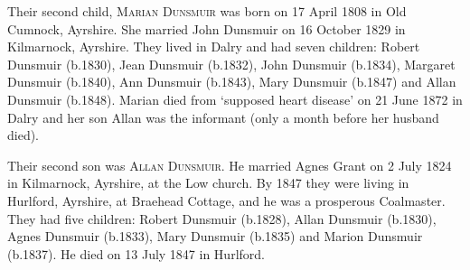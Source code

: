 Their second child, \textsc{Marian Dunsmuir} was born on 17 April 1808 in Old Cumnock, Ayrshire. She married John Dunsmuir on 16 October 1829 in Kilmarnock, Ayrshire. They lived in Dalry and had seven children:  Robert Dunsmuir (b.1830), Jean Dunsmuir (b.1832), John Dunsmuir (b.1834), Margaret Dunsmuir (b.1840), Ann Dunsmuir (b.1843), Mary Dunsmuir (b.1847) and Allan Dunsmuir (b.1848).  Marian died from `supposed heart disease' on 21 June 1872 in Dalry and her son Allan was the informant (only a month before her husband died).

Their second son was \textsc{Allan Dunsmuir}. He married Agnes Grant on 2 July 1824 in Kilmarnock, Ayrshire, at the Low church.  By 1847 they were living in Hurlford, Ayrshire, at Braehead Cottage, and he was a prosperous Coalmaster. They had five children: Robert Dunsmuir (b.1828), Allan Dunsmuir (b.1830), Agnes Dunsmuir (b.1833), Mary Dunsmuir (b.1835) and Marion Dunsmuir (b.1837). He died on 13 July 1847 in Hurlford.

  












